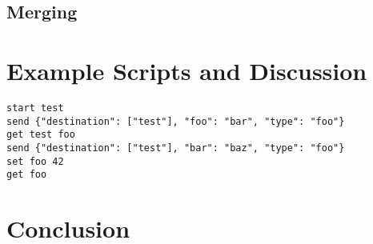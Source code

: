 \documentclass[11pt]{article}
\begin{document}
\subsection{Merging}\label{sec:Merg}



\section{Example Scripts and Discussion}\label{sec:Ex}

\begin{lstlisting}[language={}, caption={Example Script 1}, basicstyle=\ttfamily]
start test
send {"destination": ["test"], "foo": "bar", "type": "foo"}
get test foo
send {"destination": ["test"], "bar": "baz", "type": "foo"}
set foo 42
get foo
\end{lstlisting}

\section{Conclusion}\label{sec:Conc}

\clearpage

\printbibliography
\end{document}
